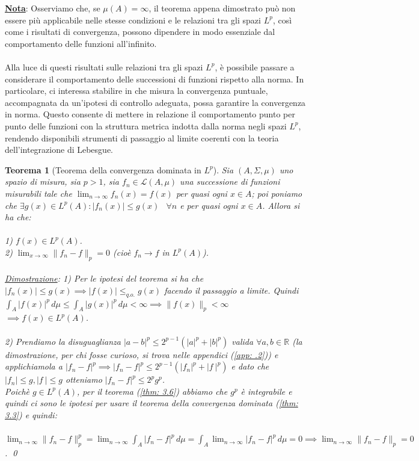 \documentclass[a4paper,12pt]{report}
\newtheorem{teorema}{Teorema}[chapter]
\newcommand{\lt}{<}
\newcommand{\gt}{>}
\begin{document}
\underline{\textbf{Nota}}: Osserviamo che, se $\mu(A)=\infty$, il teorema appena dimostrato può non essere più applicabile nelle stesse condizioni e le relazioni tra gli spazi $L^p$, così come i risultati di convergenza, possono dipendere in modo essenziale dal comportamento delle funzioni all’infinito.
\\
\\Alla luce di questi risultati sulle relazioni tra gli spazi $L^p$, è possibile passare a considerare il comportamento delle successioni di funzioni rispetto alla norma. In particolare, ci interessa stabilire in che misura la convergenza puntuale, accompagnata da un’ipotesi di controllo adeguata, possa garantire la convergenza in norma. Questo consente di mettere in relazione il comportamento punto per punto delle funzioni con la struttura metrica indotta dalla norma negli spazi $L^p$, rendendo disponibili strumenti di passaggio al limite coerenti con la teoria dell’integrazione di Lebesgue.


\begin{teorema}[Teorema della convergenza dominata in $L^p$]\label{thm: 3.7}
    Sia $(A,\Sigma,\mu)$ uno spazio di misura, sia $p\gt 1$, sia $f_n\in \mathcal{L}(A,\mu)$ una successione di funzioni misurabili tale che $\displaystyle\lim_{n\to\infty}f_n(x)=f(x)$ per quasi ogni $x\in A$; poi poniamo che \mbox{$\exists g(x)\in L^p(A): |f_n(x)|\leq g(x) $} $\  \ \forall n$ e per quasi ogni $x\in A$. Allora si ha che:
    \\
    \\ 1) $f(x)\in L^p(A)$.
    \\ 2) $\displaystyle\lim_{x\to\infty}\|f_n-f\|_p=0$ (cioè $f_n \to f$ in $L^p(A)$).
    \\
    \\\underline{Dimostrazione}: 1) Per le ipotesi del teorema si ha che \mbox{$|f_n(x)|\leq g(x) \implies |f(x)|\leq_{q.o.} g(x)$} facendo il passaggio a limite. Quindi \mbox{$\displaystyle\int_A|f(x)|^p\,d\mu\leq\int_A|g(x)|^p\,d\mu\lt \infty \implies \|f(x)\|_p\lt\infty $} $\implies f(x)\in L^p(A)$.
    \\
    \\ 2) Prendiamo la disuguaglianza $|a-b|^p\leq2^{p-1}(|a|^p+|b|^p)$ valida $\forall a, b \in \mathbb{R}$ (la dimostrazione, per chi fosse curioso, si trova nelle appendici (\ref{app: .2})) e applichiamola a $|f_n-f|^p \implies |f_n-f|^p\leq 2^{p-1}(|f_n|^p+|f\ |^p)$ e dato che $|f_n|\leq g, |f\ |\leq g$ otteniamo $|f_n-f|^p\leq 2^pg^p$.
    \\ Poichè $g\in L^p(A)$, per il teorema (\ref{thm: 3.6}) abbiamo che $g^p $ è integrabile e quindi ci sono le ipotesi per usare il teorema della convergenza dominata (\ref{thm: 3.3}) e quindi:
    \\
    \\ \mbox{$\displaystyle\lim_{n\to\infty}\|f_n-f\|_p^p=\lim_{n\to\infty}\int_A|f_n-f|^p\,d\mu=\int_A\lim_{n\to\infty}|f_n-f|^p\,d\mu=0\implies\lim_{n\to\infty}\|f_n-f\|_p=0$}. \qed
\end{teorema}
\end{document}
